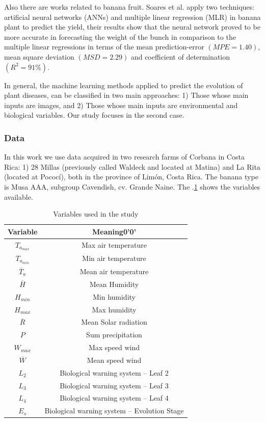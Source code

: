 \documentclass[review]{elsarticle}
\begin{document}
Also there are works related to banana fruit. Soares et al. \citep{Soares2014} apply two techniques: artificial neural networks (ANNs) and multiple linear regression (MLR) in banana plant to predict the yield, their results show that the neural network proved to be more accurate in forecasting the weight of the bunch in comparison to the multiple linear regressions in terms of the mean prediction-error $(MPE = 1.40)$, mean square deviation $(MSD = 2.29)$ and coefficient of determination $(R^2 = 91\%)$.

In general, the machine learning methods applied to predict the evolution of plant diseases, can be classified in two main approaches: 1) Those whose main inputs are images, and 2) Those whose main inputs are environmental and biological variables. Our study focuses in the second case.

\subsubsection{Data}
In this work we use data acquired in two research farms of Corbana in Costa Rica: 1) 28 Millas (previously called Waldeck and located at Matina) and La Rita (located at Pococí), both in the province of Limón, Costa Rica. The banana type is Musa AAA, subgroup Cavendish, cv. Grande Naine. The \tablename $.$\ref{tabla1} shows the variables available.

\begin{table}[h] 
\caption{Variables used in the study} 
\label{tabla1} 
\centering
\begin{tabular}{c|c} 
\hline
\bfseries Variable & \bfseries Meaning0'0' \\ 
\hline\hline 
$T_{a_{max}}$ &	Max air temperature \\
$T_{a_{min}}$ &	Min air temperature \\
$\overline{T}_{a}$	 & Mean air temperature \\
$\overline{H}$	&  Mean Humidity \\
$H_{min}$ &	Min humidity \\
$H_{max}$	& Max humidity \\
$\overline{R}$	& Mean Solar radiation \\
$P$	& Sum precipitation  \\
$W_{max}$	& Max speed wind \\
$\overline{W}$	& Mean speed wind  \\
$L_2$	& Biological warning system – Leaf 2 \\
$L_3$	& Biological warning system – Leaf 3 \\
$L_4$	& Biological warning system – Leaf 4 \\
$E_s$	& Biological warning system – Evolution Stage \\
\hline
\end{tabular} 
\end{table}
\end{document}

